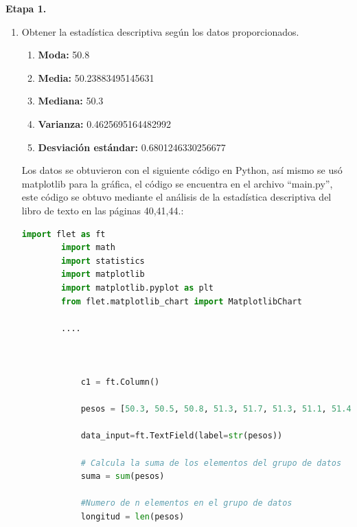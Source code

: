 \documentclass[12pt, letterpaper]{article}
\begin{document}
\textbf{  Etapa 1.}
\begin{enumerate} 
    \item Obtener la estadística descriptiva según los datos proporcionados.

\begin{enumerate}
    \item \textbf{Moda:} 50.8
    \item \textbf{Media:} 50.23883495145631
    \item \textbf{Mediana:} 50.3
    \item \textbf{Varianza:} 0.4625695164482992
    \item \textbf{Desviación estándar:} 0.6801246330256677
    
\end{enumerate}    
Los datos se obtuvieron con el siguiente código en Python, así mismo se usó matplotlib para la gráfica, el código  se encuentra en el archivo “main.py”, 
 este código se obtuvo mediante el análisis de la estadística descriptiva del libro de texto \cite{Probabilidad} en las páginas 40,41,44.:
\begin{lstlisting}[language=Python]
        import flet as ft
        import math
        import statistics
        import matplotlib
        import matplotlib.pyplot as plt
        from flet.matplotlib_chart import MatplotlibChart

        ....

 
            
            c1 = ft.Column()
            
            pesos = [50.3, 50.5, 50.8, 51.3, 51.7, 51.3, 51.1, 51.4, 51.3, 51.6, 50.2, 50.5, 50.7, 50.0, 51.1, 50.4, 50.6, 51.2, 50.4, 50.8, 50.2, 50.6, 51.2, 50.4, 50.8, 50.2, 50.6, 49.4, 49.6, 50.8, 49.9, 50.4, 50.1, 51.0, 49.3, 49.5, 49.1, 50.9, 49.6, 49.8, 49.5, 49.7, 50.0, 51.1, 49.7, 50.3, 50.4, 50.8, 49.9, 51.7, 50.0, 50.2, 49.2, 49.1, 49.2, 51.1, 50.8, 49.7, 50.5, 50.4, 49.5, 49.7, 50.5, 50.3, 50.0, 50.1, 49.1, 51.4, 50.9, 49.1, 50.6, 50.4, 50.6, 49.7, 49.2, 50.1, 49.9, 49.6, 50.7, 49.3, 50.2, 50.7, 49.3, 49.3, 50.3, 49.1, 49.9, 49.8, 50.3, 50.1, 50.5, 49.5, 50.8, 50.0, 50.7, 50.5, 49.4, 50.7, 49.1, 50.8, 50.6, 49.1, 49.3]
            
            data_input=ft.TextField(label=str(pesos))
            
            # Calcula la suma de los elementos del grupo de datos
            suma = sum(pesos)

            #Numero de n elementos en el grupo de datos
            longitud = len(pesos)
            

\end{lstlisting}
\end{enumerate}
\end{document}
